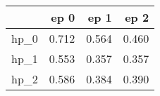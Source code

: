 \begin{tabular}{lrrr}
\toprule
{} &   ep 0 &   ep 1 &   ep 2 \\
\midrule
hp\_0 &  0.712 &  0.564 &  0.460 \\
hp\_1 &  0.553 &  0.357 &  0.357 \\
hp\_2 &  0.586 &  0.384 &  0.390 \\
\bottomrule
\end{tabular}

